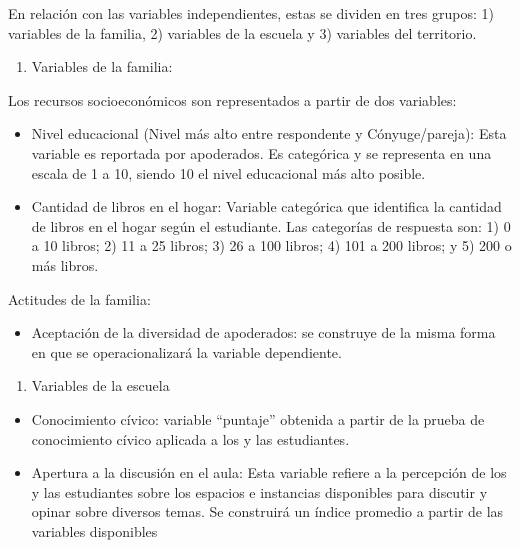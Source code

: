 \documentclass[12pt,twoside]{templates/facsothesis}
\providecommand{\tightlist}{%
  \setlength{\itemsep}{0pt}\setlength{\parskip}{0pt}}
\begin{document}
En relación con las variables independientes, estas se dividen en tres grupos: 1) variables de la familia, 2) variables de la escuela y 3) variables del territorio.

\begin{enumerate}
\def\labelenumi{\arabic{enumi})}
\tightlist
\item
  Variables de la familia:
\end{enumerate}

Los recursos socioeconómicos son representados a partir de dos variables:

\begin{itemize}
\item
  Nivel educacional (Nivel más alto entre respondente y Cónyuge/pareja): Esta variable es reportada por apoderados. Es categórica y se representa en una escala de 1 a 10, siendo 10 el nivel educacional más alto posible.
\item
  Cantidad de libros en el hogar: Variable categórica que identifica la cantidad de libros en el hogar según el estudiante. Las categorías de respuesta son: 1) 0 a 10 libros; 2) 11 a 25 libros; 3) 26 a 100 libros; 4) 101 a 200 libros; y 5) 200 o más libros.
\end{itemize}

Actitudes de la familia:

\begin{itemize}
\tightlist
\item
  Aceptación de la diversidad de apoderados: se construye de la misma forma en que se operacionalizará la variable dependiente.
\end{itemize}

\begin{enumerate}
\def\labelenumi{\arabic{enumi})}
\setcounter{enumi}{1}
\tightlist
\item
  Variables de la escuela
\end{enumerate}

\begin{itemize}
\item
  Conocimiento cívico: variable ``puntaje'' obtenida a partir de la prueba de conocimiento cívico aplicada a los y las estudiantes.
\item
  Apertura a la discusión en el aula: Esta variable refiere a la percepción de los y las estudiantes sobre los espacios e instancias disponibles para discutir y opinar sobre diversos temas. Se construirá un índice promedio a partir de las variables disponibles
\end{itemize}
\end{document}
